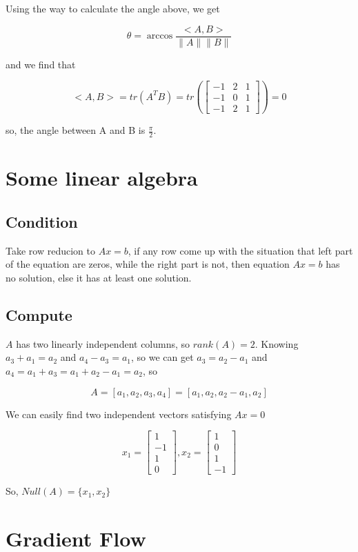 \documentclass[titlepage]{article}
\begin{document}
Using the way to calculate the angle above, we get 

\begin{equation}
    \theta = \arccos{\frac{<A,B>}{\|A\|\|B\|}}
\end{equation}

and we find that

\begin{equation}
    <A,B>=tr(A^TB)=tr(
    \begin{bmatrix}
        -1 & 2 & 1 \\
        -1 & 0 & 1 \\
        -1 & 2 & 1
    \end{bmatrix})
    =0
\end{equation}

so, the angle between A and B is $\frac{\pi}{2}$.

\section{Some linear algebra}

\subsection{Condition}

Take row reducion to $Ax=b$, if any row come up with the situation 
that left part of the equation are zeros, while the right part is not, 
then equation $Ax=b$ has no solution, else it has at least one solution.

\subsection{Compute}

$A$ has two linearly independent columns, so $rank(A)=2$. Knowing $a_3+a_1=a_2$ and $a_4-a_3=a_1$, so we can get $a_3=a_2-a_1$ 
and $a_4=a_1+a_3=a_1+a_2-a_1=a_2$, so

\begin{equation}
    A=[a_1,a_2,a_3,a_4]=[a_1,a_2,a_2-a_1,a_2]
\end{equation}

We can easily find two independent vectors satisfying $Ax=0$

\begin{equation}
    x_1=
    \begin{bmatrix}
        1\\-1\\1\\0
    \end{bmatrix},
    x_2=
    \begin{bmatrix}
        1\\0\\1\\-1
    \end{bmatrix}
\end{equation}

So, $Null(A)=\{x_1,x_2\}$

\section{Gradient Flow}
\end{document}
